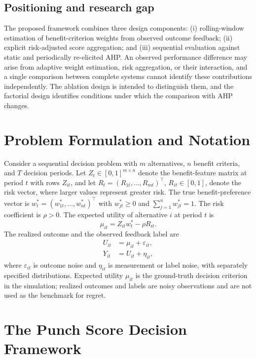 \documentclass[12pt,a4paper]{article}
\begin{document}
\subsection{Positioning and research gap}
The proposed framework combines three design components: (i) rolling-window estimation of benefit-criterion weights from observed outcome feedback; (ii) explicit risk-adjusted score aggregation; and (iii) sequential evaluation against static and periodically re-elicited AHP. An observed performance difference may arise from adaptive weight estimation, risk aggregation, or their interaction, and a single comparison between complete systems cannot identify these contributions independently. The ablation design is intended to distinguish them, and the factorial design identifies conditions under which the comparison with AHP changes.

\section{Problem Formulation and Notation}
Consider a sequential decision problem with $m$ alternatives, $n$ benefit criteria, and $T$ decision periods. Let $Z_t\in[0,1]^{m\times n}$ denote the benefit-feature matrix at period $t$ with rows $Z_{it}$, and let $R_t=(R_{1t},\dots,R_{mt})^\top$, $R_{it}\in[0,1]$, denote the risk vector, where larger values represent greater risk. The true benefit-preference vector is $w^*_t=(w^*_{1t},\dots,w^*_{nt})^\top$ with $w^*_{jt}\ge0$ and $\sum_{j=1}^n w^*_{jt}=1$. The risk coefficient is $\rho>0$. The expected utility of alternative $i$ at period $t$ is
\begin{equation}\mu_{it}=Z_{it}w^*_t-\rho R_{it}.\end{equation}
The realized outcome and the observed feedback label are
\begin{align}U_{it}&=\mu_{it}+\varepsilon_{it},\\ Y_{it}&=U_{it}+\eta_{it},\end{align}
where $\varepsilon_{it}$ is outcome noise and $\eta_{it}$ is measurement or label noise, with separately specified distributions. Expected utility $\mu_{it}$ is the ground-truth decision criterion in the simulation; realized outcomes and labels are noisy observations and are not used as the benchmark for regret.

\section{The Punch Score Decision Framework}
\end{document}
